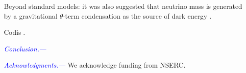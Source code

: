 \documentclass[aps,prd,twocolumn,amsmath,amssymb,amsfont,superscriptaddress]{revtex4-1}
\newcommand{\tcb}{\textcolor{blue}}
\begin{document}
Beyond standard models: it was also suggested that neutrino mass is generated by a gravitational $\theta$-term condensation as the source of dark energy \citep{2016PhRvD..93k3002D}.

Codis \citep{2018MNRAS.tmp.2447C}.

\tcb{\textit{Conclusion.---}} 

\tcb{\textit{Acknowledgments.---}}
We acknowledge funding from NSERC.



%

\end{document}
